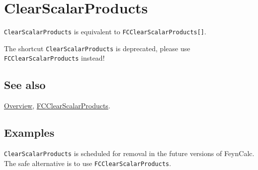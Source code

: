 \documentclass[../FeynCalcManual.tex]{subfiles}
\begin{document}
\hypertarget{clearscalarproducts}{%
\section{ClearScalarProducts}\label{clearscalarproducts}}

\texttt{ClearScalarProducts} is equivalent to
\texttt{FCClearScalarProducts[\allowbreak{}]}.

The shortcut \texttt{ClearScalarProducts} is deprecated, please use
\texttt{FCClearScalarProducts} instead!

\subsection{See also}

\hyperlink{toc}{Overview},
\hyperlink{fcclearscalarproducts}{FCClearScalarProducts}.

\subsection{Examples}

\texttt{ClearScalarProducts} is scheduled for removal in the future
versions of FeynCalc. The safe alternative is to use
\texttt{FCClearScalarProducts}.
\end{document}
